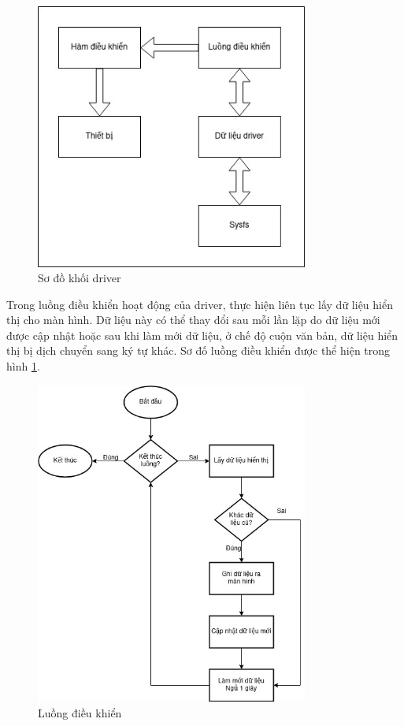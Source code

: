 \documentclass{report}
\begin{document}
\begin{figure}[H]
	\centering
	\includegraphics[width=0.8\textwidth]{../images/driver.jpg}
	\caption{Sơ đồ khối driver}
\end{figure}
Trong luồng điều khiển hoạt động của driver, thực hiện liên tục lấy dữ liệu hiển thị cho màn hình. Dữ liệu này có thể thay đổi sau mỗi lần lặp do dữ liệu mới được cập nhật hoặc sau khi làm mới dữ liệu, ở chế độ cuộn văn bản, dữ liệu hiển thị bị dịch chuyển sang ký tự khác. Sơ đố luồng điều khiển được thể hiện trong hình \ref{f:work-thread}.
\begin{figure}[H]
	\centering
	\includegraphics[width=0.8\textwidth]{../images/driver-work-thread.jpg}
	\caption{Luồng điều khiển}
	\label{f:work-thread}
\end{figure}
\end{document}
